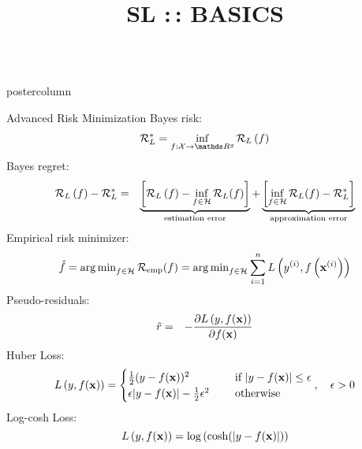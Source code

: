 \documentclass{beamer}
\title{SL :\,: BASICS} %
\newlength{\columnheight} %
\begin{document}
\begin{frame}[fragile]{}
\vspace{-8ex}
\begin{columns}
	\begin{column}{.31\textwidth}
		\begin{beamercolorbox}[center]{postercolumn}
			\begin{minipage}{.98\textwidth}
				\parbox[t][\columnheight]{\textwidth}{
\begin{myblock}{Advanced Risk Minimization}
%	
%	
	Bayes risk:
%	
	\begin{eqnarray*}
		\riskbayes_{L} = \inf_{f: \Xspace \to \R^g} \risk_L\left(f\right) 
	\end{eqnarray*}
%
	Bayes regret:
%
	{\small
	\begin{eqnarray*}
		\mathcal{R}_L\left(f \right) - \mathcal{R}^\ast_{L} &=& \underbrace{\left[\mathcal{R}_L\left( f \right) - \inf_{f \in \mathcal{H}} \mathcal{R}_L(f)\right]}_{\text{estimation error}} + \underbrace{\left[\inf_{f \in \mathcal{H}} \mathcal{R}_L(f) - \mathcal{R}^\ast_{L}\right]}_{\text{approximation error}}
	\end{eqnarray*}}
%
%
	Empirical risk minimizer:
%	
	\begin{eqnarray*}
		\hat f = \operatorname{arg\,min}_{f \in \mathcal{H}} \mathcal{R}_{\text{emp}}(f) = \operatorname{arg\,min}_{f \in \mathcal{H}} \sum\limits_{i=1}^n L\left(y^{(i)}, f\left(\mathbf{x}^{(i)}\right)\right)
	\end{eqnarray*}
%
Pseudo-residuals:
%
\vspace*{-0.3cm}
\begin{eqnarray*}
	\tilde r &=& - \frac{\partial L\left(y, f(\mathbf{x})\right)}{\partial f(\mathbf{x})}
\end{eqnarray*}
%
Huber Loss:
%
$$
L\left(y, f(\mathbf{x})\right) = \begin{cases}
\frac{1}{2}(y - f(\mathbf{x}))^2  & \text{ if } |y - f(\mathbf{x})| \le \epsilon \\
\epsilon |y - f(\mathbf{x})|-\frac{1}{2}\epsilon^2 \quad & \text{ otherwise }
\end{cases}, \quad \epsilon > 0
$$
Log-cosh Loss:
%
$$
L\left(y, f(\mathbf{x})\right) = \log \left( \cosh(\left|y - f(\mathbf{x})\right|) \right)
$$
\end{myblock}}
\end{minipage}
\end{beamercolorbox}
\end{column}
\end{columns}
\end{frame}
\end{document}
